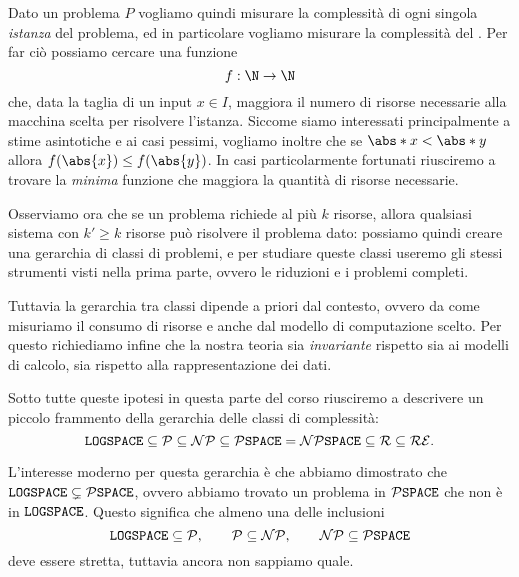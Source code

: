 Dato un problema $P$ vogliamo quindi misurare la complessità di 
ogni singola \emph{istanza} del problema, ed in particolare vogliamo misurare la complessità
del . Per far ciò possiamo cercare una funzione \[
    f : \N \to \N
\] che, data la taglia di un input $x \in I$, maggiora il numero di risorse necessarie 
alla macchina scelta per risolvere l'istanza.
Siccome siamo interessati principalmente a stime asintotiche e ai casi pessimi, 
vogliamo inoltre che se $\abs*{x} < \abs*{y}$ allora $f(\abs{x}) \leq f(\abs{y})$.
In casi particolarmente fortunati riusciremo a trovare la \emph{minima} funzione 
che maggiora la quantità di risorse necessarie.

Osserviamo ora che se un problema richiede al più $k$ risorse, allora qualsiasi sistema 
con $k' \geq k$ risorse può risolvere il problema dato: possiamo quindi creare una gerarchia
di classi di problemi, e per studiare queste classi useremo gli stessi strumenti visti
nella prima parte, ovvero le riduzioni e i problemi completi.

Tuttavia la gerarchia tra classi dipende a priori dal contesto, ovvero 
da come misuriamo il consumo di risorse e anche dal modello di computazione scelto. 
Per questo richiediamo infine che la nostra teoria sia \emph{invariante} rispetto sia 
ai modelli di calcolo, sia rispetto alla rappresentazione dei dati.

Sotto tutte queste ipotesi in questa parte del corso riusciremo a descrivere 
un piccolo frammento della gerarchia delle classi di complessità: \[
    \texttt{LOGSPACE} \subseteq \mathcal{P} \subseteq \mathcal{NP} \subseteq \mathcal{P}\texttt{SPACE} = \mathcal{NP}\texttt{SPACE} \subseteq \mathcal{R} \subseteq \mathcal{RE}.
\]

L'interesse moderno per questa gerarchia è che abbiamo dimostrato che 
$\texttt{LOGSPACE} \subsetneq \mathcal{P}\texttt{SPACE}$, ovvero abbiamo trovato un problema in $\mathcal{P}\texttt{SPACE}$ 
che non è in $\texttt{LOGSPACE}$. Questo significa che almeno una delle inclusioni \[
    \texttt{LOGSPACE} \subseteq \mathcal{P}, \qquad \mathcal{P} \subseteq \mathcal{NP}, \qquad \mathcal{NP} \subseteq \mathcal{P}\texttt{SPACE}
\] deve essere stretta, tuttavia ancora non sappiamo quale.